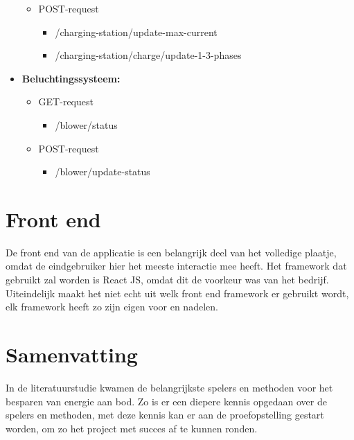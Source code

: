 \begin{itemize}
\begin{itemize}
              \item POST-request
                    \begin{itemize}
                        \item /charging-station/update-max-current
                        \item /charging-station/charge/update-1-3-phases
                    \end{itemize}
          \end{itemize}
    \item \textbf{Beluchtingssysteem:}
          \begin{itemize}
              \item GET-request
                    \begin{itemize}
                        \item /blower/status
                    \end{itemize}
              \item POST-request
                    \begin{itemize}
                        \item /blower/update-status
                    \end{itemize}
          \end{itemize}
\end{itemize}

\section{Front end}
\label{sec:stand-van-zaken-front-end}

De front end van de applicatie is een belangrijk deel van het volledige plaatje, omdat de eindgebruiker hier het meeste interactie mee heeft. Het framework dat gebruikt zal worden is React JS, omdat dit de voorkeur was van het bedrijf.\\

Uiteindelijk maakt het niet echt uit welk front end framework er gebruikt wordt, elk framework heeft zo zijn eigen voor en nadelen.

\section{Samenvatting}
\label{sec:stand-van-zaken-samenvatting}

In de literatuurstudie kwamen de belangrijkste spelers en methoden voor het besparen van energie aan bod. Zo is er een diepere kennis opgedaan over de spelers en methoden, met deze kennis kan er aan de proefopstelling gestart worden, om zo het project met succes af te kunnen ronden.